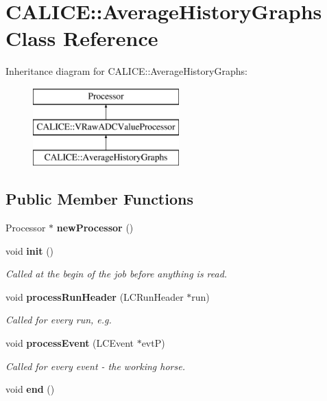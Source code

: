 \section{C\-A\-L\-I\-C\-E\-:\-:Average\-History\-Graphs Class Reference}
\label{classCALICE_1_1AverageHistoryGraphs}
Inheritance diagram for C\-A\-L\-I\-C\-E\-:\-:Average\-History\-Graphs\-:\begin{figure}[H]
\begin{center}
\leavevmode
\includegraphics[height=3.000000cm]{classCALICE_1_1AverageHistoryGraphs}
\end{center}
\end{figure}
\subsection*{Public Member Functions}
\begin{DoxyCompactItemize}
\item 
Processor $\ast$ {\bfseries new\-Processor} ()\label{classCALICE_1_1AverageHistoryGraphs_aadeafdb3a9c7e2f355af43bbe2600a36}

\item 
void {\bf init} ()
\begin{DoxyCompactList}\small\item\em Called at the begin of the job before anything is read. \end{DoxyCompactList}\item 
void {\bf process\-Run\-Header} (L\-C\-Run\-Header $\ast$run)
\begin{DoxyCompactList}\small\item\em Called for every run, e.\-g. \end{DoxyCompactList}\item 
void {\bf process\-Event} (L\-C\-Event $\ast$evt\-P)
\begin{DoxyCompactList}\small\item\em Called for every event -\/ the working horse. \end{DoxyCompactList}\item 
void {\bfseries end} ()\label{classCALICE_1_1AverageHistoryGraphs_a66fdedb6f7f91bc59a2c5acb73d9e500}

\end{DoxyCompactItemize}
